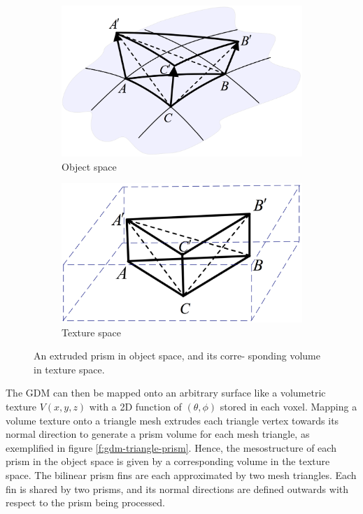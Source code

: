 \begin{figure}\label{f:gdm-triangle-prism}
\begin{center}
	\begin{subfigure}[b]{0.4\textwidth}
		\includegraphics[width=1.0\textwidth]{graphics/df/GDM-object-space}	
		\caption{Object space}
	\end{subfigure}
	\begin{subfigure}[b]{0.4\textwidth}
		\includegraphics[width=1.0\textwidth]{graphics/df/GDM-texture-space}	
		\caption{Texture space}
	\end{subfigure}
\end{center}	
\caption{An extruded prism in object space, and its corre- sponding volume in texture space.}
\end{figure}

The GDM can then be mapped onto an arbitrary surface like a volumetric texture $V(x,y,z)$ with a 2D function of $(\theta,\phi)$ stored in each voxel. Mapping a volume texture onto a triangle mesh extrudes each triangle vertex towards its normal direction to generate a prism volume for each mesh triangle, as exemplified in figure \ref{f:gdm-triangle-prism}. Hence, the mesostructure of each prism in the object space is given by a corresponding volume in the texture space. The bilinear prism fins are each approximated by two mesh triangles. Each fin is shared by two prisms, and its normal directions are defined outwards with respect to the prism being processed.


